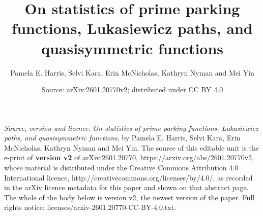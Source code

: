\documentclass[10pt,a4paper]{amsart}
\theoremstyle{definition}
\theoremstyle{remark}
\begin{document}
\title{On statistics of prime parking functions, Lukasiewicz paths, and quasisymmetric functions}
\author{Pamela E. Harris, Selvi Kara, Erin McNicholas, Kathryn Nyman and Mei Yin}
\date{Source: arXiv:2601.20770v2; distributed under CC BY 4.0}
\maketitle
\noindent\emph{Source, version and licence.} \emph{On statistics of prime parking functions, Lukasiewicz paths, and quasisymmetric functions}, by Pamela E. Harris, Selvi Kara, Erin McNicholas, Kathryn Nyman and Mei Yin. The source of this editable unit is the e-print of \textbf{version v2} of arXiv:2601.20770, https://arxiv.org/abs/2601.20770v2, whose material is distributed under the Creative Commons Attribution 4.0 International licence, http://creativecommons.org/licenses/by/4.0/, as recorded in the arXiv licence metadata for this paper and shown on that abstract page. The whole of the body below is version v2, the newest version of the paper. Full rights notice: licenses/arxiv-2601.20770-CC-BY-4.0.txt.\par\smallskip
\end{document}
